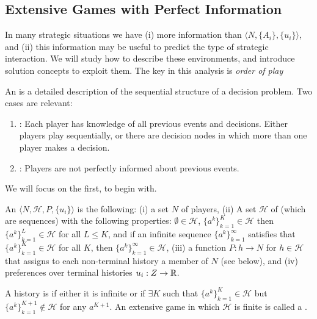 \documentclass[10pt]{article}
\begin{document}
\subsection{Extensive Games with Perfect Information}

\begin{remark}	
	In many strategic situations we have (i) more information than $\langle N,\{A_i\},\{u_i\}\rangle$, and (ii) this information may be useful to predict the type of strategic interaction. We will study how to describe these environments, and introduce solution concepts to exploit them. The key in this analysis is \emph{order of play}
\end{remark}

\begin{definition}
	An  is a detailed description of the sequential structure of a decision problem. Two cases are relevant:
	\begin{enumerate}
		\item {}: Each player has knowledge of all previous events and decisions. Either players play sequentially, or there are decision nodes in which more than one player makes a decision.
		\item {}: Players are not perfectly informed about previous events.
	\end{enumerate}
	We will focus on the first, to begin with.
\end{definition}

\begin{definition}
	An  $\langle N, \mathcal{H}, P, \{u_i\}\rangle$ is the following: (i) a set $N$ of players, (ii) A set $\mathcal{H}$ of  (which are sequences) with the following properties: $\emptyset \in \mathcal{H}$, $\{a^k\}_{k=1}^K \in \mathcal{H}$ then $\{a^k\}_{k=1}^L \in \mathcal{H}$ for all $L \le K$, and if an infinite sequence $\{a^k\}_{k=1}^\infty$ satisfies that $\{a^k\}_{k=1}^K \in \mathcal{H}$ for all $K$, then $\{a^k\}_{k=1}^\infty \in \mathcal{H}$, (iii) a function $P : h \to N$ for $h \in \mathcal{H}$ that assigns to each non-terminal history a member of $N$ (see below), and (iv) preferences over terminal histories $u_i: Z \to \mathbb{R}$. 
	
	A history is  if either it is infinite or if $\exists K$ such that $\{a^k\}_{k=1}^K \in \mathcal{H}$ but $\{a^k\}_{k=1}^{K+1} \not\in \mathcal{H}$ for any $a^{K+1}$. An extensive game in which $\mathcal{H}$ is finite is called a .
\end{definition}
\end{document}
